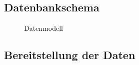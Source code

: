 \subsection{Datenbankschema}

\begin{figure}[htp] 
\caption{Datenmodell}
\label{image_konzeption_datenmodell}
\end{figure} 


\subsection{Bereitstellung der Daten}

\newpage
